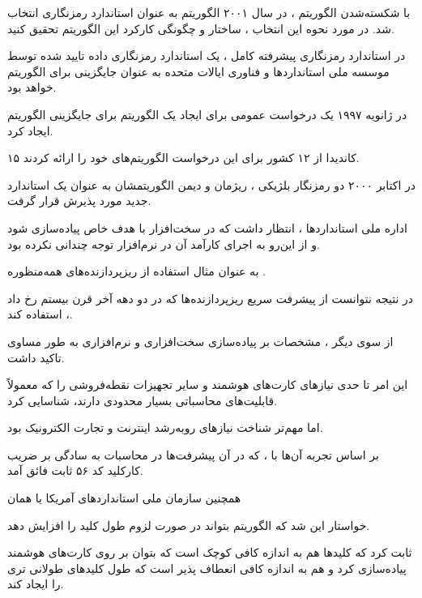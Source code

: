 \begin{boxK}
با شکسته‌شدن الگوریتم
، 
در سال ۲۰۰۱ 
الگوریتم
به عنوان استاندارد رمزنگاری انتخاب شد.
در مورد نحوه این انتخاب ، ساختار و چگونگی کارکرد این الگوریتم تحقیق کنید.
\end{boxK}

\begin{boxL}
در استاندارد رمزنگاری پیشرفته کامل ، 
یک استاندارد رمزنگاری داده تایید شده توسط موسسه ملی استانداردها و فناوری ایالات متحده به عنوان جایگزینی برای الگوریتم
خواهد بود.

در ژانویه ۱۹۹۷ 
یک درخواست عمومی برای ایجاد یک الگوریتم برای جایگزینی 
الگوریتم 
ایجاد کرد.

۱۵ 
کاندیدا از 
۱۲ 
کشور
برای این درخواست الگوریتم‌های خود را ارائه کردند.

 
 در اکتابر ۲۰۰۰
دو
رمزنگار بلژیکی  ،
ریژمان و دیمن
الگوریتمشان به عنوان یک استاندارد جدید مورد پذیرش قرار گرفت.

اداره ملی استانداردها ،
انتظار داشت که
در سخت‌افزار با هدف خاص پیاده‌سازی شود و از این‌رو به اجرای کارآمد آن در نرم‌افزار توجه چندانی نکرده بود.

به عنوان مثال استفاده از ریزپردازنده‌های همه‌منظوره .

در نتیجه 
نتوانست از پیشرفت سریع ریزپردازنده‌ها که در دو دهه آخر قرن بیستم رخ داد ، استفاده کند.

از سوی دیگر ، مشخصات 
بر پیاده‌سازی سخت‌افزاری و نرم‌افزاری به طور مساوی تاکید داشت.

این امر تا حدی نیازهای کارت‌های هوشمند و سایر تجهیزات نقطه‌فروشی را که معمولاً قابلیت‌های محاسباتی بسیار محدودی دارند، شناسایی کرد.

اما مهم‌تر شناخت نیازهای رو‌به‌رشد اینترنت و تجارت الکترونیک بود.

بر اساس تجربه آن‌ها با
 ،
که در آن پیشرفت‌ها در محاسبات به سادگی بر ضریب کارکلید کد ۵۶ ثابت فائق آمد.

همچنین سازمان ملی استانداردهای آمریکا یا همان

خواستار این شد که الگوریتم بتواند در صورت لزوم طول کلید را افزایش دهد.

ثابت کرد که
کلیدها
هم به اندازه کافی 
کوچک است که بتوان بر روی کارت‌های هوشمند پیاده‌سازی کرد و هم به اندازه کافی انعطاف پذیر است که طول کلیدهای طولانی تری را ایجاد کند.
\end{boxL}

